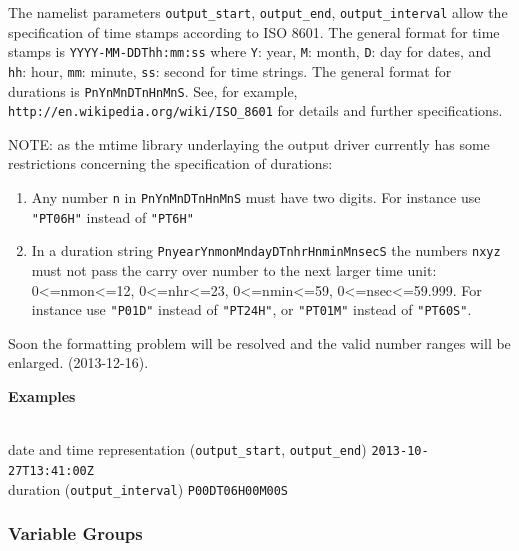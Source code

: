 The namelist parameters \texttt{output\_start}, \texttt{output\_end}, \texttt{output\_interval} allow
the specification of time stamps according to ISO 8601.
The general format for time stamps is \texttt{YYYY-MM-DDThh:mm:ss}
where \texttt{Y}: year, \texttt{M}: month, \texttt{D}: day for dates,
and   \texttt{hh}: hour, \texttt{mm}: minute, \texttt{ss}: second for time strings.
The general format for durations is \texttt{PnYnMnDTnHnMnS}.
See, for example, \texttt{http://en.wikipedia.org/wiki/ISO\_8601} for details and further specifications.

\color{red}NOTE: as the mtime library underlaying the output driver
  currently has some restrictions concerning the specification of durations:\begin{enumerate}
\item Any number \texttt{n} in \texttt{PnYnMnDTnHnMnS} must have two digits. For instance use \texttt{"PT06H"} instead of \texttt{"PT6H"}
\item In a duration string \texttt{PnyearYnmonMndayDTnhrHnminMnsecS} the numbers \texttt{nxyz} must not pass the carry over number to the next larger time unit: 0<=nmon<=12, 0<=nhr<=23, 0<=nmin<=59, 0<=nsec<=59.999. For instance use \texttt{"P01D"} instead of \texttt{"PT24H"}, or \texttt{"PT01M"} instead of \texttt{"PT60S"}.
\end{enumerate}

Soon the formatting problem will be resolved and the valid number ranges will be enlarged.
(2013-12-16).\color{black}

\begin{tabbing}
  \parbox{0.7\textwidth}{\textbf{Examples}} \= \\
  date and time representation (\texttt{output\_start}, \texttt{output\_end}) \>
  \texttt{2013-10-27T13:41:00Z} \\
  duration (\texttt{output\_interval}) \>
  \texttt{P00DT06H00M00S} \\
\end{tabbing}



\subsubsection*{Variable Groups}
